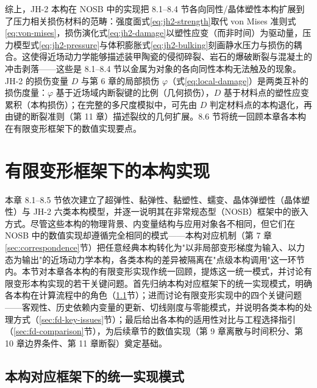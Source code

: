 综上，JH-2 本构在 NOSB 中的实现把 8.1--8.4 节各向同性/晶体塑性本构扩展到了压力相关损伤材料的范畴：强度面式\eqref{eq:jh2-strength}取代 von Mises 准则式\eqref{eq:von-mises}，损伤演化式\eqref{eq:jh2-damage}以塑性应变（而非时间）为驱动量，压力模型式\eqref{eq:jh2-pressure}与体积膨胀式\eqref{eq:jh2-bulking}刻画静水压力与损伤的耦合。这使得近场动力学能够描述装甲陶瓷的侵彻碎裂、岩石的爆破断裂与混凝土的冲击剥落——这些是 8.1--8.4 节以金属为对象的各向同性本构无法触及的现象。JH-2 的损伤变量 $D$ 与第 6 章的局部损伤 $\varphi$（式\eqref{eq:local-damage}）是两类互补的损伤度量：$\varphi$ 基于近场域内断裂键的比例（几何损伤），$D$ 基于材料点的塑性应变累积（本构损伤）；在完整的多尺度模拟中，可先由 $D$ 判定材料点的本构退化，再由键的断裂准则（第 11 章）描述裂纹的几何扩展。8.6 节将统一回顾本章各本构在有限变形框架下的数值实现要点。

\section{有限变形框架下的本构实现}

本章 8.1--8.5 节依次建立了超弹性、黏弹性、黏塑性、蠕变、晶体弹塑性（晶体塑性）与 JH-2 六类本构模型，并逐一说明其在非常规态型（NOSB）框架中的嵌入方式。尽管这些本构的物理背景、内变量结构与应用对象各不相同，但它们在 NOSB 中的数值实现却遵循完全相同的模式——本构对应机制（第 7 章\ref{sec:correspondence}节）把任意经典本构转化为"以非局部变形梯度为输入、以力态为输出"的近场动力学本构，各类本构的差异被隔离在"点级本构调用"这一环节内。本节对本章各本构的有限变形实现作统一回顾，提炼这一统一模式，并讨论有限变形本构实现的若干关键问题。首先归纳本构对应框架下的统一实现模式，明确各本构在计算流程中的角色（\ref{sec:fd-unified}节）；进而讨论有限变形实现中的四个关键问题——客观性、历史依赖内变量的更新、切线刚度与零能模式，并说明各类本构的处理方式（\ref{sec:fd-key-issues}节）；最后给出各本构的适用性对比与工程选择指引（\ref{sec:fd-comparison}节），为后续章节的数值实现（第 9 章离散与时间积分、第 10 章边界条件、第 11 章断裂）奠定基础。

\subsection{本构对应框架下的统一实现模式}\label{sec:fd-unified}

